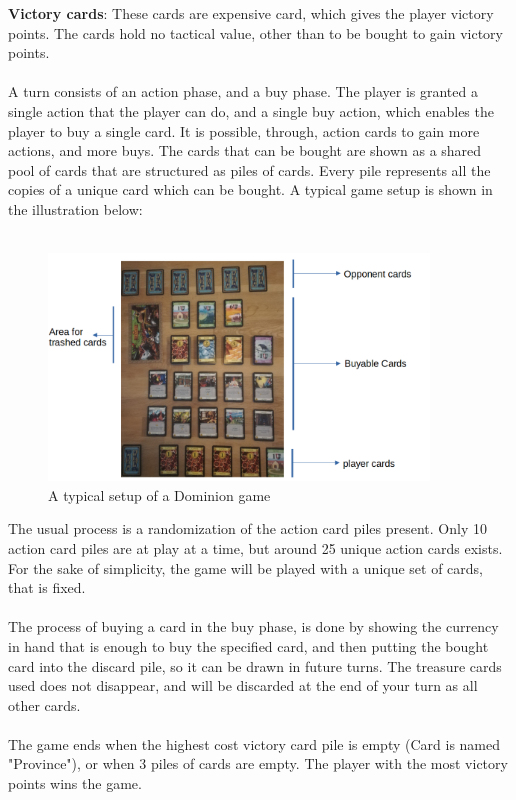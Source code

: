 \textbf{Victory cards}:
These cards are expensive card, which gives the player victory points. The cards hold no tactical value, other than to be bought to gain victory points.\\\\
A turn consists of an action phase, and a buy phase. The player is granted a single action that the player can do, and a single buy action, which enables the player to buy a single card. It is possible, through, action cards to gain more actions, and more buys. The cards that can be bought are shown as a shared pool of cards that are structured as piles of cards. Every pile represents all the copies of a unique card which can be bought. A typical game setup is shown in the illustration below:\\\\
\begin{figure}[H]
    \centering
    \includegraphics[width=0.9\textwidth]{img/Board_game_setup.png}
    \caption{A typical setup of a Dominion game}
    \label{fig:board_game}
\end{figure}
The usual process is a randomization of the action card piles present. Only 10 action card piles are at play at a time, but around 25 unique action cards exists. For the sake of simplicity, the game will be played with a unique set of cards, that is fixed.\\\\
The process of buying a card in the buy phase, is done by showing the currency in hand that is enough to buy the specified card, and then putting the bought card into the discard pile, so it can be drawn in future turns. The treasure cards used does not disappear, and will be discarded at the end of your turn as all other cards.\\\\
The game ends when the highest cost victory card pile is empty (Card is named "Province"), or when 3 piles of cards are empty. The player with the most victory points wins the game.\\\\


